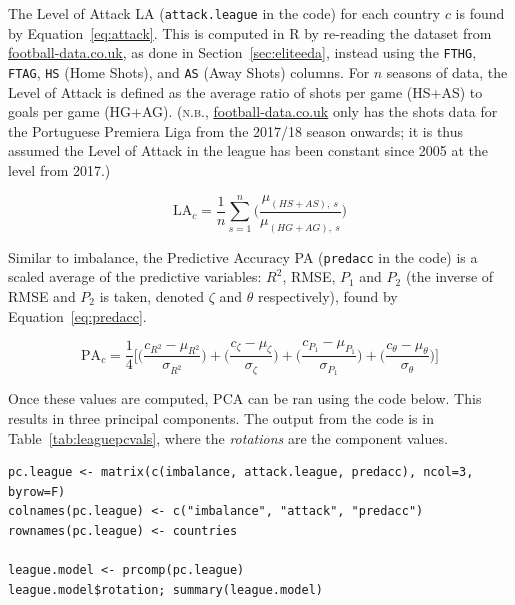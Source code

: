 \documentclass[a4paper,10pt]{report}
\begin{document}
The Level of Attack LA (\lstinline|attack.league| in the code) for each country $c$ is found by Equation~\ref{eq:attack}. This is computed in R by re-reading the dataset from \url{football-data.co.uk}, as done in Section~\ref{sec:eliteeda}, instead using the \lstinline|FTHG|, \lstinline|FTAG|, \lstinline|HS| (Home Shots), and \lstinline|AS| (Away Shots) columns. For $n$ seasons of data, the Level of Attack is defined as the average ratio of shots per game (HS+AS) to goals per game (HG+AG). (\textsc{n.b.}, \url{football-data.co.uk} only has the shots data for the Portuguese Premiera Liga from the 2017/18 season onwards; it is thus assumed the Level of Attack in the league has been constant since 2005 at the level from 2017.)

\begin{equation}
\textrm{LA}_c = 
\frac{1}{n}\sum^{n}_{s=1} \bigg(\frac{\mu_{(HS+AS),\ s}}{\mu_{(HG+AG),\ s}} \bigg)\label{eq:attack}
\end{equation}

Similar to imbalance, the Predictive Accuracy PA (\lstinline|predacc| in the code) is a scaled average of the predictive variables: $R^2$, RMSE, $P_1$ and $P_2$ (the inverse of RMSE and $P_2$ is taken, denoted $\zeta$ and $\theta$ respectively), found by Equation~\ref{eq:predacc}.

\begin{equation}
\textrm{PA}_{c} = \frac{1}{4}\bigg[
\bigg( \frac{ c_{R^2} - \mu_{R^2} }{ \sigma_{R^2}} \bigg) + 
\bigg( \frac{ c_{\zeta} - \mu_{\zeta} }{ \sigma_{\zeta}} \bigg) + 
\bigg( \frac{ c_{P_1} - \mu_{P_1} }{ \sigma_{P_1}} \bigg) +
\bigg( \frac{ c_{\theta} - \mu_{\theta} }{ \sigma_{\theta}} \bigg)
\bigg] \label{eq:predacc}
\end{equation}


Once these values are computed, PCA can be ran using the code below. This results in three principal components. The output from the code is in Table~\ref{tab:leaguepcvals}, where the \textit{rotations} are the component values.

\begin{lstlisting}
pc.league <- matrix(c(imbalance, attack.league, predacc), ncol=3, byrow=F)
colnames(pc.league) <- c("imbalance", "attack", "predacc")
rownames(pc.league) <- countries

league.model <- prcomp(pc.league)
league.model$rotation; summary(league.model)
\end{lstlisting}
\end{document}
